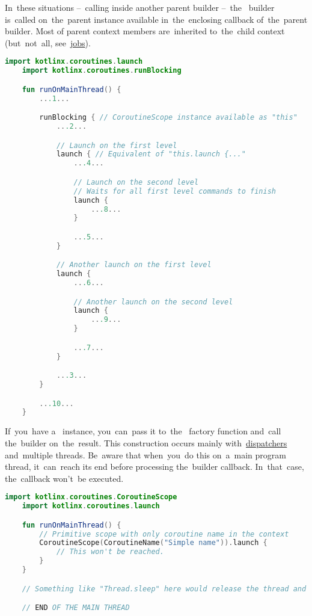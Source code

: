 In~these situations --~calling inside another parent builder --~the~ builder is~called on~the~parent  instance available in~the~enclosing callback of~the~parent builder.
Most of parent context members are~inherited to~the~child context (but~not~all, see~\hyperref[kotlincoroutinejob]{jobs}).

\begin{lstlisting}[language=Kotlin, title={Numbers represent the~order of~execution}]
    import kotlinx.coroutines.launch
    import kotlinx.coroutines.runBlocking

    fun runOnMainThread() {
        ...1...

        runBlocking { // CoroutineScope instance available as "this"
            ...2...

            // Launch on the first level
            launch { // Equivalent of "this.launch {..."
                ...4...

                // Launch on the second level
                // Waits for all first level commands to finish
                launch {
                    ...8...
                }

                ...5...
            }

            // Another launch on the first level
            launch {
                ...6...

                // Another launch on the second level
                launch {
                    ...9...
                }

                ...7...
            }

            ...3...
        }

        ...10...
    }
\end{lstlisting}
\newline

\noindent If~you~have a~ instance, you~can~pass it to~the~ factory function and~call the~builder on~the~result.
This construction occurs mainly with~\hyperref[kotlincoroutinedispatcher]{dispatchers} and~multiple threads.
Be~aware that when~you~do this on~a~main program thread, it~can~reach its end before processing the~builder callback.
In~that~case, the~callback won't~be executed.

\begin{lstlisting}[language=Kotlin]
    import kotlinx.coroutines.CoroutineScope
    import kotlinx.coroutines.launch

    fun runOnMainThread() {
        // Primitive scope with only coroutine name in the context
        CoroutineScope(CoroutineName("Simple name")).launch {
            // This won't be reached.
        }
    }

    // Something like "Thread.sleep" here would release the thread and the callback would run.

    // END OF THE MAIN THREAD
\end{lstlisting}
\newline

